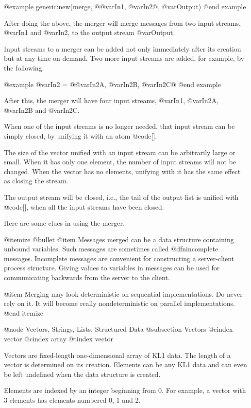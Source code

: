 {{@example
generic:new(merge, @{@var{In1}, @var{In2}@}, @var{Output})
@end example

After doing the above, the merger will merge messages from two input
streams, @var{In1} and @var{In2}, to the output stream @var{Output}.

Input streams to a merger can be added not only immediately after its
creation but at any time on demand.  Two more input streams are added,
for example, by the following.

@example
@var{In2} = @{@var{In2A}, @var{In2B}, @var{In2C}@}
@end example

After this, the merger will have four input streams, @var{In1},
@var{In2A}, @var{In2B} and @var{In2C}.

When one of the input streams is no longer needed, that input stream
can be simply closed, by unifying it with an atom @code{[]}.

The size of the vector unified with an input stream can be arbitrarily
large or small.  When it has only one element, the number of input
streams will not be changed.  When the vector has no elements,
unifying with it has the same effect as closing the stream.

The output stream will be closed, i.e., the tail of the output list is
unified with @code{[]}, when all the input streams have been closed.

Here are some clues in using the merger.

@itemize @bullet
@item
Messages merged can be a data structure containing unbound variables.
Such messages are sometimes called @dfn{incomplete messages}.
Incomplete messages are convenient for constructing a server-client
process structure.  Giving values to variables in messages can be used
for communicating backwards from the server to the client.

@item
Merging may look deterministic on sequential implementations.  Do never
rely on it.  It will become really nondeterministic on parallel
implementations.
@end itemize

@node Vectors, Strings, Lists, Structured Data
@subsection Vectors
@cindex vector
@cindex array
@tindex vector

Vectors are fixed-length one-dimensional array of KL1 data.  The length
of a vector is determined on its creation.  Elements can be any KL1 data
and can even be left undefined when the data structure is created.

Elements are indexed by an integer beginning from 0.  For example, a
vector with 3 elements has elements numbered 0, 1 and 2.

}}

